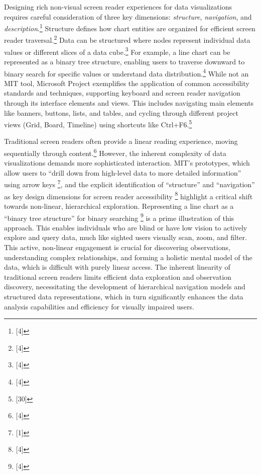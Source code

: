 Designing rich non-visual screen reader experiences for data visualizations requires careful consideration of three key dimensions: \textit{structure}, \textit{navigation}, and \textit{description}.\footnote{[4]} Structure defines how chart entities are organized for efficient screen reader traversal.\footnote{[4]} Data can be structured where nodes represent individual data values or different slices of a data cube.\footnote{[4]} For example, a line chart can be represented as a binary tree structure, enabling users to traverse downward to binary search for specific values or understand data distribution.\footnote{[4]} While not an MIT tool, Microsoft Project exemplifies the application of common accessibility standards and techniques, supporting keyboard and screen reader navigation through its interface elements and views. This includes navigating main elements like banners, buttons, lists, and tables, and cycling through different project views (Grid, Board, Timeline) using shortcuts like Ctrl+F6.\footnote{[30]}

Traditional screen readers often provide a linear reading experience, moving sequentially through content.\footnote{[4]} However, the inherent complexity of data visualizations demands more sophisticated interaction. MIT's prototypes, which allow users to ``drill down from high-level data to more detailed information'' using arrow keys \footnote{[1]}, and the explicit identification of ``structure'' and ``navigation'' as key design dimensions for screen reader accessibility \footnote{[4]} highlight a critical shift towards non-linear, hierarchical exploration. Representing a line chart as a ``binary tree structure'' for binary searching \footnote{[4]} is a prime illustration of this approach. This enables individuals who are blind or have low vision to actively explore and query data, much like sighted users visually scan, zoom, and filter. This active, non-linear engagement is crucial for discovering observations, understanding complex relationships, and forming a holistic mental model of the data, which is difficult with purely linear access. The inherent linearity of traditional screen readers limits efficient data exploration and observation discovery, necessitating the development of hierarchical navigation models and structured data representations, which in turn significantly enhances the data analysis capabilities and efficiency for visually impaired users.


